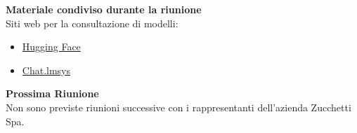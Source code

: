 \documentclass{article}
\begin{document}

\textbf{Materiale condiviso durante la riunione\\}
Siti web per la consultazione di modelli:
\begin{itemize}
    \item \href{https://huggingface.co/}{Hugging Face} 
\end{itemize}
\begin{itemize}
    \item \href{https://chat.lmsys.org/}{Chat.lmsys}\\
\end{itemize}

\textbf{Prossima Riunione}\\
Non sono previste riunioni successive con i rappresentanti dell'azienda Zucchetti Spa.
\end{document}
